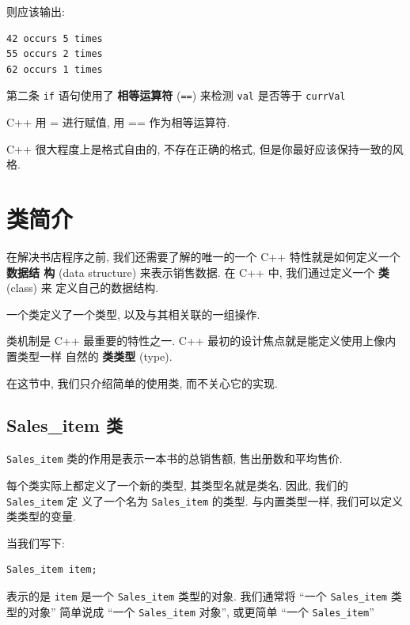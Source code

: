 \documentclass[lang=cn]{elegantbook}
\begin{document}
则应该输出:

\begin{verbatim}
42 occurs 5 times
55 occurs 2 times
62 occurs 1 times
\end{verbatim}

第二条 \texttt{if} 语句使用了 \textbf{相等运算符} (\texttt{==}) 来检测 \texttt{val} 是否等于 \texttt{currVal}

\vspace*{1\baselineskip}
\begin{note}
C++ 用 = 进行赋值, 用 == 作为相等运算符.
\end{note}


\vspace*{1\baselineskip}
\begin{definition}[C++ 程序的缩进和格式]
C++ 很大程度上是格式自由的, 不存在正确的格式, 但是你最好应该保持一致的风格.
\end{definition}

\section{类简介}
\label{sec:org5a50424}

在解决书店程序之前, 我们还需要了解的唯一的一个 C++ 特性就是如何定义一个 \textbf{数据结
构} (data structure) 来表示销售数据. 在 C++ 中, 我们通过定义一个 \textbf{类} (class) 来
定义自己的数据结构.

一个类定义了一个类型, 以及与其相关联的一组操作.

类机制是 C++ 最重要的特性之一. C++ 最初的设计焦点就是能定义使用上像内置类型一样
自然的 \textbf{类类型} (type).

在这节中, 我们只介绍简单的使用类, 而不关心它的实现.

\subsection{Sales\_item 类}
\label{sec:org2472844}

\texttt{Sales\_item} 类的作用是表示一本书的总销售额, 售出册数和平均售价.

每个类实际上都定义了一个新的类型, 其类型名就是类名. 因此, 我们的 \texttt{Sales\_item} 定
义了一个名为 \texttt{Sales\_item} 的类型. 与内置类型一样, 我们可以定义类类型的变量.

当我们写下:

\begin{verbatim}
Sales_item item;
\end{verbatim}

表示的是 \texttt{item} 是一个 \texttt{Sales\_item} 类型的对象. 我们通常将 ``一个 \texttt{Sales\_item} 类
型的对象'' 简单说成 ``一个 \texttt{Sales\_item} 对象'', 或更简单 ``一个 \texttt{Sales\_item}''
\end{document}
